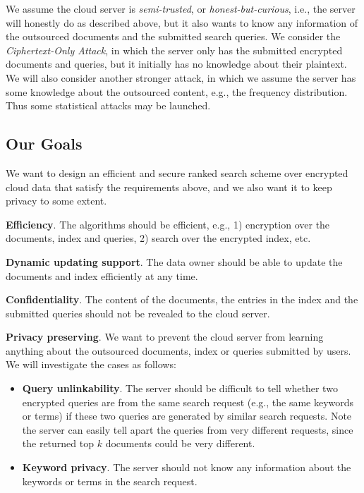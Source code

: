\documentclass{article}
\begin{document}
We assume the cloud server is \emph{semi-trusted}, or \emph{honest-but-curious}, i.e., the server will honestly do as described above, but it also wants to know any information of the outsourced documents and the submitted search queries. We consider the \emph{Ciphertext-Only Attack}, in which the server only has the submitted encrypted documents and queries, but it initially has no knowledge about their plaintext. We will also consider another stronger attack, in which we assume the server has some knowledge about the outsourced content, e.g., the frequency distribution. Thus some statistical attacks may be launched.

\subsection{Our Goals}
We want to design an efficient and secure ranked search scheme over encrypted cloud data that satisfy the requirements above, and we also want it to keep privacy to some extent.

\textbf{Efficiency}. The algorithms should be efficient, e.g., 1) encryption over the documents, index and queries, 2) search over the encrypted index, etc.

\textbf{Dynamic updating support}. The data owner should be able to update the documents and index efficiently at any time.

\textbf{Confidentiality}. The content of the documents, the entries in the index and the submitted queries should not be revealed to the cloud server.

\textbf{Privacy preserving}. We want to prevent the cloud server from learning anything about the outsourced documents, index or queries submitted by users. We will investigate the cases as follows:
\begin{itemize}
\item \textbf{Query unlinkability}. The server should be difficult to tell whether two encrypted queries are from the same search request (e.g., the same keywords or terms) if these two queries are generated by similar search requests. Note the server can easily tell apart the queries from very different requests, since the returned top $k$ documents could be very different.
\item \textbf{Keyword privacy}. The server should not know any information about the keywords or terms in the search request.
\end{itemize}
\end{document}

